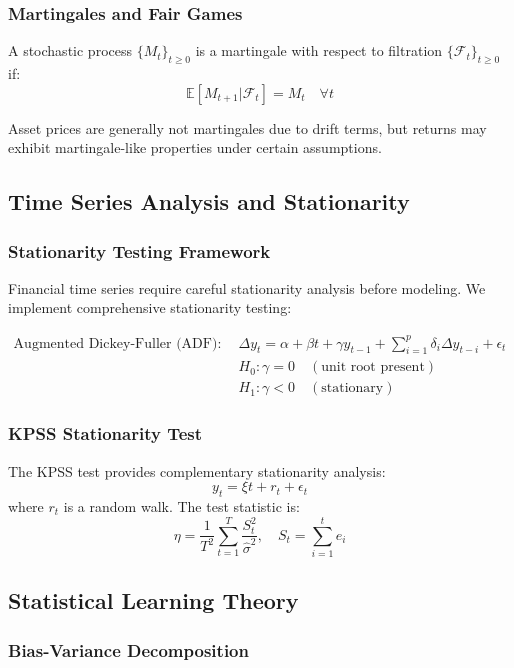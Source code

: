 \documentclass[11pt,letterpaper,openany]{book}
\begin{document}
\subsubsection{Martingales and Fair Games}

A stochastic process $\{M_t\}_{t \geq 0}$ is a martingale with respect to filtration $\{\mathcal{F}_t\}_{t \geq 0}$ if:
\[
\mathbb{E}[M_{t+1} | \mathcal{F}_t] = M_t \quad \forall t
\]

Asset prices are generally not martingales due to drift terms, but returns may exhibit martingale-like properties under certain assumptions.

\subsection{Time Series Analysis and Stationarity}

\subsubsection{Stationarity Testing Framework}

Financial time series require careful stationarity analysis before modeling. We implement comprehensive stationarity testing:

\begin{align}
\text{Augmented Dickey-Fuller (ADF):} \quad & \Delta y_t = \alpha + \beta t + \gamma y_{t-1} + \sum_{i=1}^p \delta_i \Delta y_{t-i} + \epsilon_t \\
&H_0: \gamma = 0 \quad (\text{unit root present}) \\
&H_1: \gamma < 0 \quad (\text{stationary})
\end{align}

\subsubsection{KPSS Stationarity Test}

The KPSS test provides complementary stationarity analysis:
\[
y_t = \xi t + r_t + \epsilon_t
\]
where $r_t$ is a random walk. The test statistic is:
\[
\eta = \frac{1}{T^2} \sum_{t=1}^T \frac{S_t^2}{\hat{\sigma}^2}, \quad S_t = \sum_{i=1}^t e_i
\]

\subsection{Statistical Learning Theory}

\subsubsection{Bias-Variance Decomposition}
\end{document}
